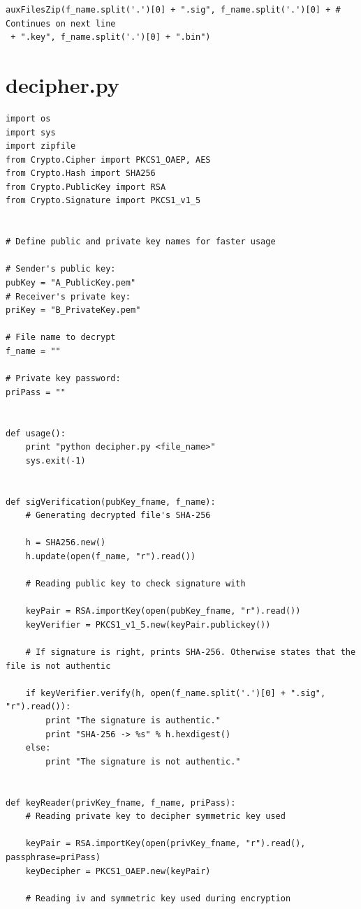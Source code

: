 \documentclass[a4paper,11pt,openright,oneside]{report}
\begin{document}
\begin{appendices}
\begin{verbatim}
auxFilesZip(f_name.split('.')[0] + ".sig", f_name.split('.')[0] + # Continues on next line
 + ".key", f_name.split('.')[0] + ".bin")
\end{verbatim}

\newpage
\section{decipher.py}
\label{App:decipher.py}

\begin{verbatim}
import os
import sys
import zipfile
from Crypto.Cipher import PKCS1_OAEP, AES
from Crypto.Hash import SHA256
from Crypto.PublicKey import RSA
from Crypto.Signature import PKCS1_v1_5


# Define public and private key names for faster usage

# Sender's public key:
pubKey = "A_PublicKey.pem"
# Receiver's private key:
priKey = "B_PrivateKey.pem"

# File name to decrypt
f_name = ""

# Private key password:
priPass = ""


def usage():
    print "python decipher.py <file_name>"
    sys.exit(-1)


def sigVerification(pubKey_fname, f_name):
    # Generating decrypted file's SHA-256

    h = SHA256.new()
    h.update(open(f_name, "r").read())

    # Reading public key to check signature with

    keyPair = RSA.importKey(open(pubKey_fname, "r").read())
    keyVerifier = PKCS1_v1_5.new(keyPair.publickey())

    # If signature is right, prints SHA-256. Otherwise states that the file is not authentic

    if keyVerifier.verify(h, open(f_name.split('.')[0] + ".sig", "r").read()):
        print "The signature is authentic."
        print "SHA-256 -> %s" % h.hexdigest()
    else:
        print "The signature is not authentic."


def keyReader(privKey_fname, f_name, priPass):
    # Reading private key to decipher symmetric key used

    keyPair = RSA.importKey(open(privKey_fname, "r").read(), passphrase=priPass)
    keyDecipher = PKCS1_OAEP.new(keyPair)

    # Reading iv and symmetric key used during encryption


\end{verbatim}
\end{appendices}
\end{document}
